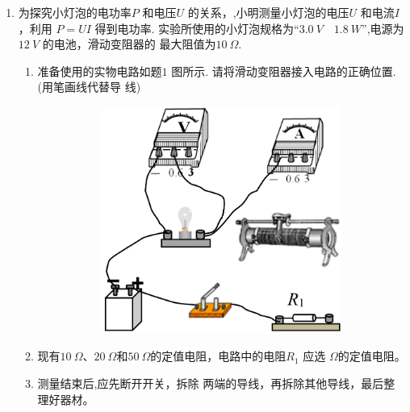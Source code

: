\begin{enumerate}
\item 
{}
为探究小灯泡的电功率$ P $ 和电压$ U $ 的关系，,小明测量小灯泡的电压$ U $ 和电流$ I $，利用
$ P=UI $ 得到电功率. 实验所使用的小灯泡规格为“$ 3.0 \ V \quad 1.8 \ W $”,电源为$ 12 \ V $ 的电池，滑动变阻器的
最大阻值为$ 10 \ \Omega $.
\begin{enumerate}
\item
准备使用的实物电路如题$ 1 $ 图所示. 请将滑动变阻器接入电路的正确位置.(用笔画线代替导
线)
\begin{figure}[h!]
\centering
\begin{subfigure}{0.4\linewidth}
\centering
\includegraphics[width=0.7\linewidth]{picture/screenshot066}
\caption{}\label{}
\end{subfigure}
\begin{subfigure}{0.4\linewidth}
\centering
 
\caption{}\label{}
\end{subfigure}
\end{figure}




\item 
现有$ 10 \ \Omega $、$ 20 \ \Omega $和$ 50 \ \Omega $的定值电阻，电路中的电阻$ R_{1} $ 应选 \underlinegap $ \Omega $的定值电阻。

\item 
测量结束后,应先断开开关，拆除 \underlinegap 两端的导线，再拆除其他导线，最后整理好器材。


\end{enumerate}
\end{enumerate}
